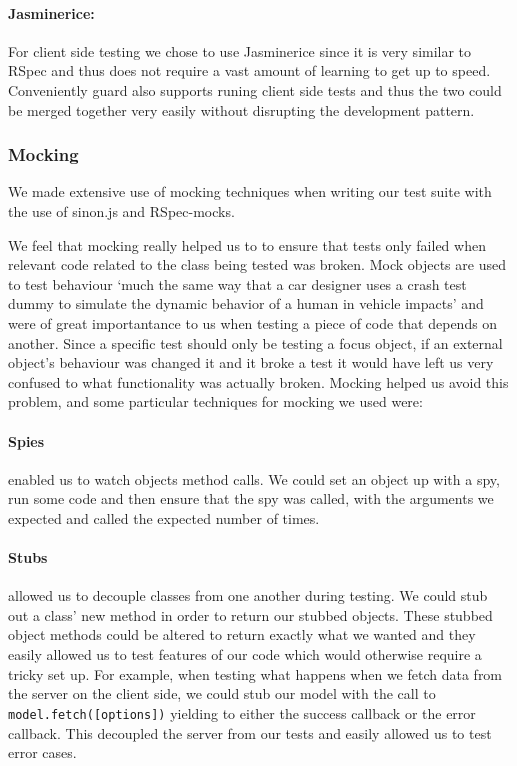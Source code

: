     \paragraph{Jasminerice:}
      For client side testing we chose to use Jasminerice since it is very similar to RSpec and thus does not require a vast amount of learning to get up to speed. Conveniently guard also supports runing client side tests and thus the two could be merged together very easily without disrupting the development pattern.

  \subsubsection{Mocking}
    We made extensive use of mocking techniques when writing our test suite with the use of sinon.js\cite{sinon} and RSpec-mocks\cite{rspec_mocks}.

    We feel that mocking really helped us to to ensure that tests only failed when relevant code related to the class being tested was broken. Mock objects are used to test behaviour `much the same way that a car designer uses a crash test dummy to simulate the dynamic behavior of a human in vehicle impacts'\cite{mock_quote} and were of great importantance to us when testing a piece of code that depends on another.
    Since a specific test should only be testing a focus object, if an external object's behaviour was changed it and it broke a test it would have left us very confused to what functionality was actually broken. Mocking helped us avoid this problem, and some particular techniques for mocking we used were:
    
    \paragraph{Spies} enabled us to watch objects method calls. We could set an object up with a spy, run some code and then ensure that the spy was called, with the arguments we expected and called the expected number of times.

    \paragraph{Stubs} allowed us to decouple classes from one another during testing. We could stub out a class' new method in order to return our stubbed objects.
    These stubbed object methods could be altered to return exactly what we wanted and they easily allowed us to test features of our code which would otherwise require a tricky set up.
    For example, when testing what happens when we fetch data from the server on the client side, we could stub our model with the call to \verb!model.fetch([options])! yielding to either the success callback or the error callback.
    This decoupled the server from our tests and easily allowed us to test error cases.



